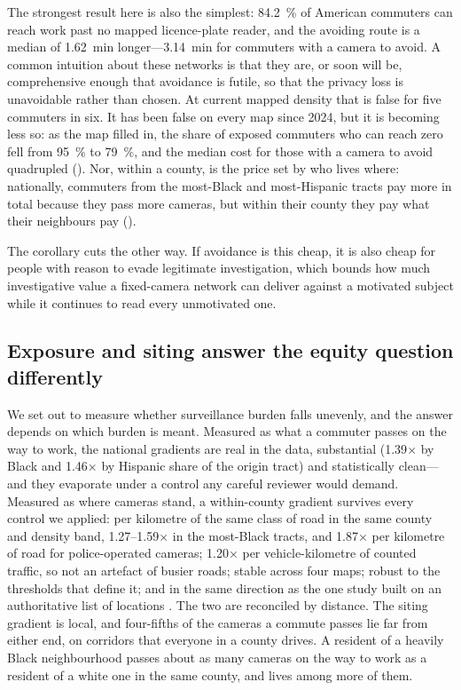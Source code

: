 \documentclass[11pt,twoside]{article}
\begin{document}
The strongest result here is also the simplest: \SI{84.2}{\percent} of American commuters
can reach work past no mapped licence-plate reader, and the avoiding route is a median of
\SI{1.62}{\minute} longer---\SI{3.14}{\minute} for commuters with a camera to avoid. A common
intuition about these networks is that they are, or soon will be, comprehensive enough that
avoidance is futile, so that the privacy loss is unavoidable rather than chosen. At current
mapped density that is false for five commuters in six. It has been false on every map since 2024, but it is
becoming less so: as the map filled in, the share of exposed commuters who can reach zero
fell from \SI{95}{\percent} to \SI{79}{\percent}, and the median cost for those with a camera
to avoid quadrupled (). Nor, within a county, is the price set by who
lives where: nationally, commuters from the most-Black and most-Hispanic tracts pay more in total
because they pass more cameras, but within their county they pay what their neighbours pay
().

The corollary cuts the other way. If avoidance is this cheap, it is also cheap for people
with reason to evade legitimate investigation, which bounds how much investigative value a
fixed-camera network can deliver against a motivated subject while it continues to read
every unmotivated one.

\subsection{Exposure and siting answer the equity question differently}

We set out to measure whether surveillance burden falls unevenly, and the answer depends on
which burden is meant. Measured as what a commuter passes on the way to work, the national
gradients are real in the data, substantial (\num{1.39}$\times$ by Black and
\num{1.46}$\times$ by Hispanic share of the origin tract) and statistically clean---and they
evaporate under a control any careful reviewer would demand. Measured as where cameras stand, a
within-county gradient survives every control we applied: per kilometre of the same class of
road in the same county and density band, \numrange{1.27}{1.59}$\times$ in the most-Black
tracts, and \num{1.87}$\times$ per kilometre of road for police-operated cameras;
\num{1.20}$\times$ per vehicle-kilometre of counted traffic, so not an artefact of busier roads; stable across four maps; robust to
the thresholds that define it; and in the same direction as the one study built on an
authoritative list of locations \citep{keener2026}. The two are reconciled by distance. The
siting gradient is local, and four-fifths of the cameras a commute passes lie far from either
end, on corridors that everyone in a county drives. A resident of a heavily Black neighbourhood
passes about as many cameras on the way to work as a resident of a white one in the same
county, and lives among more of them.
\end{document}
